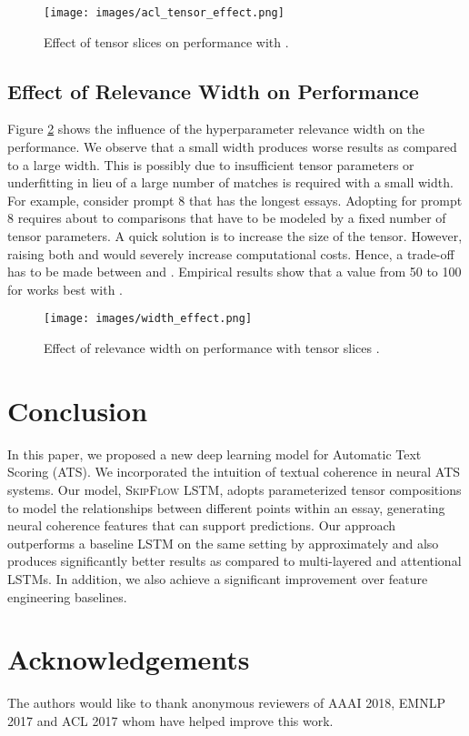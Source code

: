 \documentclass[letterpaper]{article}
\begin{document}
\begin{figure}[ht]
  
  \centering
    \texttt{[image: images/acl\_tensor\_effect.png]}
    \caption{Effect of tensor slices on performance with .}
    \label{fig:tensor_effect}
\end{figure}

\subsection{Effect of Relevance Width  on Performance}

Figure \ref{fig:width_effect} shows the influence of the hyperparameter relevance width  on the performance. We observe that a small width produces worse results as compared to a large width. This is possibly due to insufficient tensor parameters or underfitting in lieu of a large number of matches is required with a small width. For example, consider prompt 8 that has the longest essays. Adopting  for prompt 8 requires about  to  comparisons that have to be modeled by a fixed number of tensor parameters. A quick solution is to increase the size of the tensor. However, raising both  and  would severely increase computational costs. Hence, a trade-off has to be made between  and . Empirical results show that a value from 50 to 100 for  works best with . 

\begin{figure}[ht]
  
  \centering
    \texttt{[image: images/width\_effect.png]}
    \caption{Effect of relevance width  on performance with tensor slices .}
    \label{fig:width_effect}
\end{figure}

\section{Conclusion}
In this paper, we proposed a new deep learning model for Automatic Text Scoring (ATS). We incorporated the intuition of textual coherence in neural ATS systems. Our model, \textsc{SkipFlow} LSTM, adopts parameterized tensor compositions to model the relationships between different points within an essay, generating neural coherence features that can support predictions. Our approach outperforms a baseline LSTM on the same setting by approximately  and also produces significantly better results as compared to multi-layered and attentional LSTMs. In addition, we also achieve a significant  improvement over feature engineering baselines. 

\section{Acknowledgements}
The authors would like to thank anonymous reviewers of AAAI 2018, EMNLP 2017 and ACL 2017 whom have helped improve this work. 
 

\end{document}
